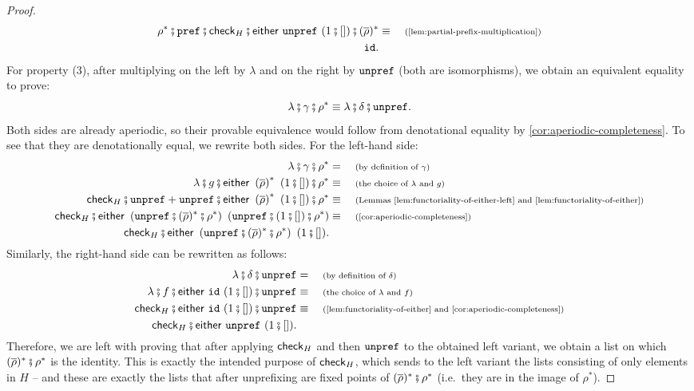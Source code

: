 \begin{proof}
\begin{align*}
        \rho^* \comp \prefterm \comp \checkterm_H \comp \either{\unprefterm}{(1\comp [])} \comp (\inv \rho)^* \equalbecause{\cref{lem:partial-prefix-multiplication}} \\ 
        \idterm.
    \end{align*}
    For property (3), after multiplying on the left by $\lambda$ and on the right by $\mathtt{unpref}$ (both are isomorphisms), we obtain an equivalent equality to prove:
    \[
        \lambda \comp \gamma \comp \rho^* \equiv \lambda \comp \delta \comp \unprefterm.
    \]
    Both sides are already aperiodic, so their provable equivalence would follow from denotational equality by \cref{cor:aperiodic-completeness}. To see that they are denotationally equal, we rewrite both sides. For the left-hand side:
    \begin{align*}
        \lambda \comp \gamma \comp \rho^* &= \why{by definition of $\gamma$} \\ 
        \lambda \comp g \comp \either{\left( \inv \rho \right)^*}{(1\comp[])} \comp \rho^* \equalbecause{the choice of $\lambda$ and $g$} \\
        \checkterm_H \comp \unprefterm + \unprefterm \comp \either{\left( \inv \rho \right)^*}{(1\comp[])} \comp \rho^* \equalbecause{Lemmas \ref{lem:functoriality-of-either-left} and \ref{lem:functoriality-of-either}} \\
        \checkterm_H \comp \either{\left( \unprefterm \comp (\inv \rho)^* \comp \rho^* \right)}{\left( \unprefterm \comp (1 \comp []) \comp \rho^* \right)} \equalbecause{\cref{cor:aperiodic-completeness}} \\ 
        \checkterm_H \comp \either{\left( \unprefterm \comp (\inv \rho)^* \comp \rho^* \right)}{(1 \comp [])}.
    \end{align*}
    Similarly, the right-hand side can be rewritten as follows:
    \begin{align*}
        \lambda \comp \delta \comp \unprefterm &= \why{by definition of $\delta$} \\
        \lambda \comp f \comp \either{\idterm}{(1\comp[])} \comp \unprefterm \equalbecause{the choice of $\lambda$ and $f$} \\
        \checkterm_H \comp \either{\idterm}{(1\comp[])} \comp \unprefterm \equalbecause{\cref{lem:functoriality-of-either} and \cref{cor:aperiodic-completeness}} \\ 
        \checkterm_H \comp \either{\unprefterm}{(1 \comp [])}.
    \end{align*}
    Therefore, we are left with proving that after applying $\mathsf{check}_H$ and then $\mathtt{unpref}$ to the obtained left variant, we obtain a list on which $(\inv \rho)^* \comp \rho^*$ is the identity. This is exactly the intended purpose of $\mathsf{check}_H$, which sends to the left variant the lists consisting of only elements in $H$ -- and these are exactly the lists that after unprefixing are fixed points of $(\inv \rho)^* \comp \rho^*$ (i.e.~they are in the image of $\rho^*$).


\end{proof}
